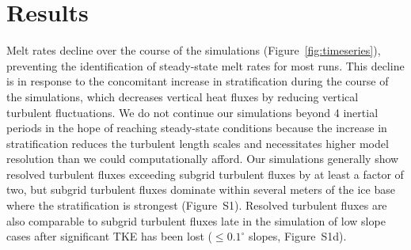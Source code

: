 \documentclass[draft]{styles/agujournal2019}
\begin{document}
\section{Results}\label{results}

Melt rates decline over the course of the simulations (Figure~\ref{fig:timeseries}), preventing the identification of steady-state melt rates for most runs. This decline is in response to the concomitant increase in stratification during the course of the simulations, which decreases vertical heat fluxes by reducing vertical turbulent fluctuations. We do not continue our simulations beyond 4 inertial periods in the hope of reaching steady-state conditions because the increase in stratification reduces the turbulent length scales and necessitates higher model resolution than we could computationally afford. Our simulations generally show resolved turbulent fluxes exceeding subgrid turbulent fluxes by at least a factor of two, but subgrid turbulent fluxes dominate within several meters of the ice base where the stratification is strongest (Figure~S1). Resolved turbulent fluxes are also comparable to subgrid turbulent fluxes late in the simulation of low slope cases after significant TKE has been lost ($\leq\!0.1^{\circ}$ slopes, Figure~S1d).
\end{document}

